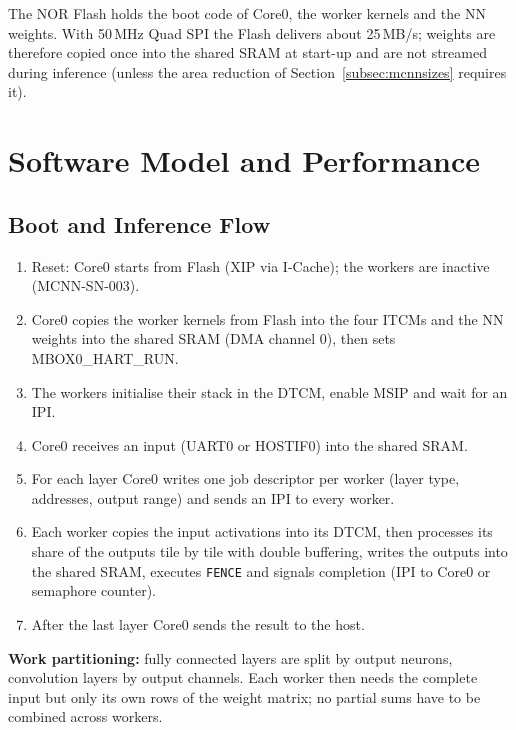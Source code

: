 The NOR Flash holds the boot code of Core0, the worker kernels and the NN
weights. With 50\,MHz Quad SPI the Flash delivers about 25\,MB/s; weights
are therefore copied once into the shared SRAM at start-up and are not
streamed during inference (unless the area reduction of
Section~\ref{subsec:mcnnsizes} requires it).

\section{Software Model and Performance}
\label{sec:mcnnsw}

\subsection{Boot and Inference Flow}
\label{subsec:mcnnflow}

\begin{enumerate}
  \item Reset: Core0 starts from Flash (XIP via I-Cache); the workers are
    inactive (MCNN-SN-003).
  \item Core0 copies the worker kernels from Flash into the four ITCMs and
    the NN weights into the shared SRAM (DMA channel 0), then sets
    MBOX0\_HART\_RUN.
  \item The workers initialise their stack in the DTCM, enable MSIP and wait
    for an IPI.
  \item Core0 receives an input (UART0 or HOSTIF0) into the shared SRAM.
  \item For each layer Core0 writes one job descriptor per worker (layer type,
    addresses, output range) and sends an IPI to every worker.
  \item Each worker copies the input activations into its DTCM, then
    processes its share of the outputs tile by tile with double buffering,
    writes the outputs into the shared SRAM, executes \texttt{FENCE} and
    signals completion (IPI to Core0 or semaphore counter).
  \item After the last layer Core0 sends the result to the host.
\end{enumerate}

\textbf{Work partitioning:} fully connected layers are split by output
neurons, convolution layers by output channels. Each worker then needs the
complete input but only its own rows of the weight matrix; no partial sums
have to be combined across workers.

